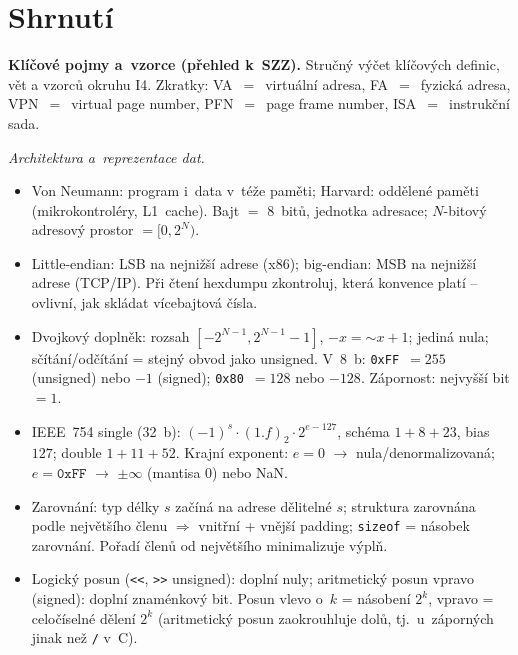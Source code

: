 \documentclass[11pt,a4paper]{article}
\newcommand{\cd}{\lstinline[style=kod]}
\begin{document}








\section*{Shrnutí}
\begin{poznamka}
\textbf{Klíčové pojmy a~vzorce (přehled k~SZZ).} Stručný výčet klíčových definic, vět a vzorců okruhu I4. Zkratky: VA~$=$~virtuální adresa, FA~$=$~fyzická adresa, VPN~$=$~virtual page number, PFN~$=$~page frame number, ISA~$=$~instrukční sada.

\smallskip
\emph{Architektura a~reprezentace dat.}
\begin{itemize}
  \item Von Neumann: program i~data v~téže paměti; Harvard: oddělené paměti (mikrokontroléry, L1~cache). Bajt $=$ 8~bitů, jednotka adresace; $N$-bitový adresový prostor $= [0, 2^{N})$.
  \item Little-endian: LSB na nejnižší adrese (x86); big-endian: MSB na nejnižší adrese (TCP/IP). Při čtení hexdumpu zkontroluj, která konvence platí -- ovlivní, jak skládat vícebajtová čísla.
  \item Dvojkový doplněk: rozsah $[-2^{N-1},2^{N-1}-1]$, $-x = \mathord{\sim}x+1$; jediná nula; sčítání/odčítání = stejný obvod jako unsigned. V~8~b: \texttt{0xFF}~$= 255$ (unsigned) nebo $-1$ (signed); \texttt{0x80}~$= 128$ nebo $-128$. Zápornost: nejvyšší bit $= 1$.
  \item IEEE~754 single (32~b): $(-1)^{s}{\cdot}(1{.}f)_2{\cdot}2^{e-127}$, schéma $1{+}8{+}23$, bias~$127$; double $1{+}11{+}52$. Krajní exponent: $e=0$ $\to$ nula/denormalizovaná; $e=\texttt{0xFF}$ $\to$ $\pm\infty$ (mantisa $0$) nebo NaN.
  \item Zarovnání: typ délky $s$ začíná na adrese dělitelné $s$; struktura zarovnána podle největšího členu $\Rightarrow$ vnitřní + vnější padding; \texttt{sizeof} = násobek zarovnání. Pořadí členů od největšího minimalizuje výplň.
  \item Logický posun (\texttt{<<}, \texttt{>>} unsigned): doplní nuly; aritmetický posun vpravo (signed): doplní znaménkový bit. Posun vlevo o~$k$ = násobení $2^{k}$, vpravo = celočíselné dělení $2^{k}$ (aritmetický posun zaokrouhluje dolů, tj.\ u~záporných jinak než \cd!/! v~C).
\end{itemize}


\end{poznamka}
\end{document}
